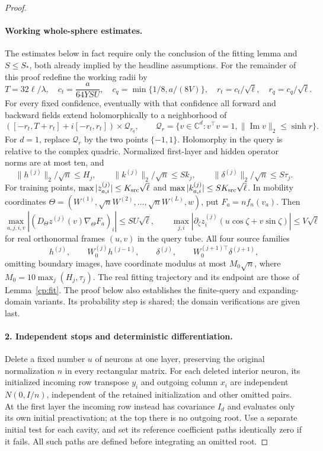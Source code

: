 \begin{proof}
\paragraph{Working whole-sphere estimates.}
The estimates below in fact require only the conclusion of the fitting
lemma and \(S\le S_*\), both already implied by the headline assumptions.
For the remainder of this proof redefine the working radii by
\[
 T=32\ell/\lambda,\quad c_t=\frac a{64YSU},\quad
 c_q=\min\{1/8,a/(8V)\},\quad r_t=c_t/\sqrt\ell,
 \quad r_q=c_q/\sqrt\ell.
\]
For every fixed confidence, eventually with that confidence all forward
and backward fields extend holomorphically to a neighborhood of
\[
 ([-r_t,T+r_t]+i[-r_t,r_t])\times\mathcal Q_{r_q},\qquad
 \mathcal Q_r=\{v\in\mathbb C^d:v^\top v=1,
                           \|\operatorname{Im}v\|_2\le\sinh r\}.
\]
For \(d=1\), replace \(\mathcal Q_r\) by the two points \(\{-1,1\}\).
Holomorphy in the query is relative to the complex quadric.
Normalized first-layer and hidden operator norms are at most ten, and
\[
 \|h^{(j)}\|_2/\sqrt n\le H_j,\qquad
 \|k^{(j)}\|_2/\sqrt n\le Sk_j,\qquad
 \|\delta^{(j)}\|_2/\sqrt n\le S\tau_j.
\]
For training points,
\(\max|z_{a,i}^{(j)}|\le K_{\rm src}\sqrt\ell\) and
\(\max|k_{a,i}^{(j)}|\le SK_{\rm src}\sqrt\ell\).
In mobility coordinates
\(\Theta=(W^{(1)},\sqrt nW^{(2)},\ldots,\sqrt nW^{(L)},w)\),
put \(F_a=nf_n(v_a)\).  Then
\[
 \max_{a,j,i,v}|(D_\Theta z^{(j)}(v)\nabla_\Theta F_a)_i|
       \le SU\sqrt\ell,\qquad
 \max_{j,i}|\partial_\zeta z_i^{(j)}(u\cos\zeta+v\sin\zeta)|
       \le V\sqrt\ell
\]
for real orthonormal frames \((u,v)\) in the query tube.
All four source families
\[
 h^{(j)},\qquad W_0^{(j)}h^{(j-1)},\qquad\delta^{(j)},\qquad
 W_0^{(j+1)\top}\delta^{(j+1)},
\]
omitting boundary images, have
coordinate modulus at most \(M_0\sqrt n\), where
\(M_0=10\max_j(H_j,\tau_j)\).  The real fitting trajectory and its
endpoint are those of Lemma~\ref{cp:fit}.
The proof below also establishes the finite-query and expanding-domain
variants.  Its probability step is shared; the domain verifications are
given last.

\paragraph{2. Independent stops and deterministic differentiation.}
\label{cp:src-local}

Delete a fixed number \(u\) of neurons at one layer, preserving the
original normalization \(n\) in every rectangular matrix.  For each
deleted interior neuron, its initialized incoming row transpose \(y_i\)
and outgoing column \(x_i\) are independent \(N(0,I/n)\), independent
of the retained initialization and other omitted pairs.  At the first
layer the incoming row instead has covariance \(I_d\) and evaluates
only its own initial preactivation; at the top there is no outgoing
root.  Use a separate initial test for each cavity, and set its
reference coefficient paths identically zero if it fails.  All such
paths are defined before integrating an omitted root.


\end{proof}
